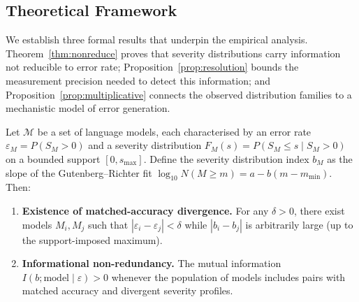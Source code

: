 %

\subsection{Theoretical Framework}
\label{sec:theory}

We establish three formal results that underpin the empirical analysis.
Theorem~\ref{thm:nonreduce} proves that severity distributions carry
information not reducible to error rate; Proposition~\ref{prop:resolution}
bounds the measurement precision needed to detect this information;
and Proposition~\ref{prop:multiplicative} connects the observed distribution
families to a mechanistic model of error generation.

\begin{theorem}
\label{thm:nonreduce}
Let $\mathcal{M}$ be a set of language models, each characterised by an
error rate $\varepsilon_M = P(S_M > 0)$ and a severity distribution
$F_M(s) = P(S_M \leq s \mid S_M > 0)$ on a bounded support $[0, s_{\max}]$.
Define the severity distribution index $b_M$ as the slope of the
Gutenberg--Richter fit $\log_{10} N(M \geq m) = a - b(m - m_{\min})$.
Then:

\begin{enumerate}[label=(\roman*)]
\item \textbf{Existence of matched-accuracy divergence.} For any
$\delta > 0$, there exist models $M_i, M_j$ such that
$|\varepsilon_i - \varepsilon_j| < \delta$ while
$|b_i - b_j|$ is arbitrarily large (up to the support-imposed maximum).

\item \textbf{Informational non-redundancy.} The mutual information
$I(b; \text{model} \mid \varepsilon) > 0$ whenever the population of
models includes pairs with matched accuracy and divergent severity
profiles.
\end{enumerate}
\end{theorem}

